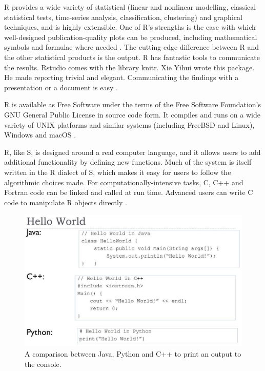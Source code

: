 	R provides a wide variety of statistical (linear and nonlinear modelling, classical statistical tests, time-series analysis, classification, clustering) and graphical techniques, and is highly extensible. One of R's strengths is the ease with which well-designed publication-quality plots can be produced, including mathematical symbols and formulae where needed \cite{r_project}. The cutting-edge difference between R and the other statistical products is the output. R has fantastic tools to communicate the results. Rstudio comes with the library knitr. Xie Yihui wrote this package. He made reporting trivial and elegant. Communicating the findings with a presentation or a document is easy \cite{r_vs_py}.
	
	R is available as Free Software under the terms of the Free Software Foundation's GNU General Public License in source code form. It compiles and runs on a wide variety of UNIX platforms and similar systems (including FreeBSD and Linux), Windows and macOS \cite{r_project}.
	
	R, like S, is designed around a real computer language, and it allows users to add additional functionality by defining new functions. Much of the system is itself written in the R dialect of S, which makes it easy for users to follow the algorithmic choices made. For computationally-intensive tasks, C, C++ and Fortran code can be linked and called at run time. Advanced users can write C code to manipulate R objects directly \cite{r_project}.
		
	\begin{figure}[t]
		\includegraphics[width=15cm]{graphics/python_vs_java_vs_c++.jpg}
		\caption{A comparison between Java, Python and C++ to print an output to the console. \cite{py_ja_c++}}
		\label{fig:py_java_c++}
	\end{figure}
	
